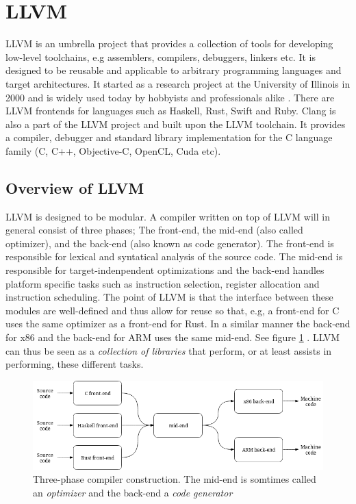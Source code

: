 \section{LLVM}
\label{sec:llvm}

LLVM is an umbrella project that provides a collection of tools for developing low-level
toolchains, e.g assemblers, compilers, debuggers, linkers etc. It is designed to be reusable and
applicable to arbitrary programming languages and target architectures. It started as a
research project at the University of Illinois in 2000 and is widely used today by hobbyists
and professionals alike \cite{llvm-overview}. There are LLVM frontends for languages such
as Haskell\cite{ghc-backend}, Rust\cite{rust-llvm}, Swift\cite{swift-llvm} and Ruby\cite{rubymotion}. Clang is also a part
of the LLVM project and built upon the LLVM toolchain. It provides a compiler, debugger
and standard library implementation for the C language family (C, C++, Objective-C,
OpenCL, Cuda etc)\cite{clang}.

\subsection{Overview of LLVM}

LLVM is designed to be modular. A compiler written on top of LLVM will in general consist
of three phases; The front-end, the mid-end (also called optimizer), and the back-end
(also known as code generator). The front-end is responsible for lexical and syntatical
analysis of the source code. The mid-end is responsible for target-indenpendent optimizations
and the back-end handles platform specific tasks such as instruction selection, register
allocation and instruction scheduling\cite[Section~11.1]{aosa-llvm}. The point of LLVM is
that the interface between these modules are well-defined and thus allow for reuse so
that, e.g, a front-end for C uses the same optimizer as a front-end for Rust. In a similar
manner the back-end for x86 and the back-end for ARM uses the same mid-end. See figure
\ref{fig:three_phase_compiler} \cite[Section~11.4]{aosa-llvm}. LLVM can thus be seen as a \textit{collection of libraries}
\cite[Section~11.4.2]{aosa-llvm} that perform, or at least assists in performing, these different tasks.

\begin{figure}[h]
	\centering
	\includegraphics[width=12cm]{background/llvm/figures/three_phase_compiler}
	\caption{Three-phase compiler construction. The mid-end is somtimes called an \textit{optimizer}
	and the back-end a \textit{code generator}}
	\label{fig:three_phase_compiler}
\end{figure}

